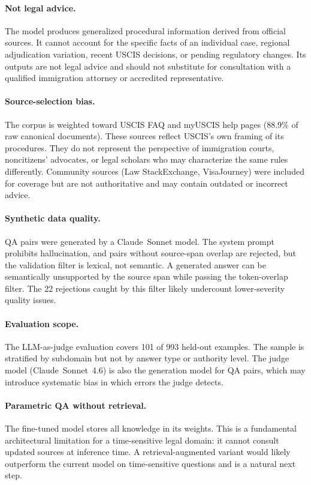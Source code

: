 \documentclass[11pt]{article}
\begin{document}
\paragraph{Not legal advice.} The model produces generalized procedural information derived from official sources. It cannot account for the specific facts of an individual case, regional adjudication variation, recent USCIS decisions, or pending regulatory changes. Its outputs are not legal advice and should not substitute for consultation with a qualified immigration attorney or accredited representative.

\paragraph{Source-selection bias.} The corpus is weighted toward USCIS FAQ and myUSCIS help pages (88.9\% of raw canonical documents). These sources reflect USCIS's own framing of its procedures. They do not represent the perspective of immigration courts, noncitizens' advocates, or legal scholars who may characterize the same rules differently. Community sources (Law StackExchange, VisaJourney) were included for coverage but are not authoritative and may contain outdated or incorrect advice.

\paragraph{Synthetic data quality.} QA pairs were generated by a Claude~Sonnet model. The system prompt prohibits hallucination, and pairs without source-span overlap are rejected, but the validation filter is lexical, not semantic. A generated answer can be semantically unsupported by the source span while passing the token-overlap filter. The 22 rejections caught by this filter likely undercount lower-severity quality issues.

\paragraph{Evaluation scope.} The LLM-as-judge evaluation covers 101 of 993 held-out examples. The sample is stratified by subdomain but not by answer type or authority level. The judge model (Claude~Sonnet~4.6) is also the generation model for QA pairs, which may introduce systematic bias in which errors the judge detects.

\paragraph{Parametric QA without retrieval.} The fine-tuned model stores all knowledge in its weights. This is a fundamental architectural limitation for a time-sensitive legal domain: it cannot consult updated sources at inference time. A retrieval-augmented variant \citep{mahari2024legalsifter} would likely outperform the current model on time-sensitive questions and is a natural next step.
\end{document}
